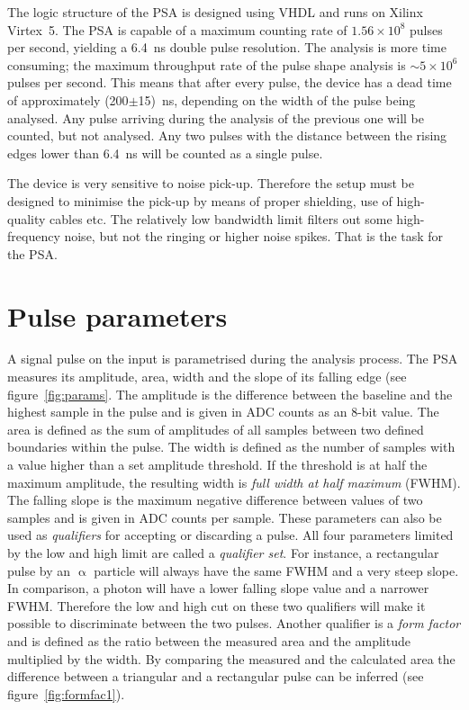 The logic structure of the PSA is designed using VHDL and runs on Xilinx Virtex~5. The PSA is capable of a maximum counting rate of $1.56\times10^8$ pulses per second, yielding a 6.4~ns double pulse resolution. The analysis is more time consuming; the maximum throughput rate of the pulse shape analysis is $\sim5\times10^6$ pulses per second. This means that after every pulse, the device has a dead time of approximately (200$\pm$15)~ns, depending on the width of the pulse being analysed. Any pulse arriving during the analysis of the previous one will be counted, but not analysed. Any two pulses with the distance between the rising edges lower than 6.4~ns will be counted as a single pulse.

The device is very sensitive to noise pick-up. Therefore the setup must be designed to minimise the pick-up by means of proper shielding, use of high-quality cables etc. The relatively low bandwidth limit filters out some high-frequency noise, but not the ringing or higher noise spikes. That is the task for the PSA.


\section{Pulse parameters}
A signal pulse on the input is parametrised during the analysis process. The PSA measures its amplitude, area, width and the slope of its falling edge (see figure~\ref{fig:params}. The amplitude is the difference between the baseline and the highest sample in the pulse and is given in ADC counts as an 8-bit value. The area is defined as the sum of amplitudes of all samples between two defined boundaries within the pulse. The width is defined as the number of samples with a value higher than a set amplitude threshold. If the threshold is at half the maximum amplitude, the resulting width is \emph{full width at half maximum} (FWHM). The falling slope is the maximum negative difference between values of two samples and is given in ADC counts per sample. These parameters can also be used as \emph{qualifiers} for accepting or discarding a pulse. All four parameters limited by the low and high limit are called a \emph{qualifier set}. For instance, a rectangular pulse by an $\upalpha$ particle will always have the same FWHM and a very steep slope. In comparison, a photon will have a lower falling slope value and a narrower FWHM. Therefore the low and high cut on these two qualifiers will make it possible to discriminate between the two pulses. Another qualifier is a \emph{form factor} and is defined as the ratio between the measured area and the amplitude multiplied by the width. By comparing the measured and the calculated area the difference between a triangular and a rectangular pulse can be inferred (see figure~\ref{fig:formfac1}).


